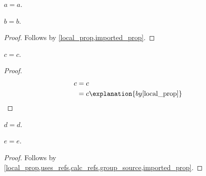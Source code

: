 

\begin{proposition}\label{local_prop}
    $a = a$.
\end{proposition}

\begin{proposition}\label{uses_refs}
    $b = b$.
\end{proposition}
\begin{proof}
    Follows by \cref{local_prop,imported_prop}.
\end{proof}

\begin{proposition}\label{calc_refs}
    $c = c$.
\end{proposition}
\begin{proof}
    \begin{align*}
        c
            &= c
                \\
            &= c
                \explanation{by \cref{local_prop}}
    \end{align*}
\end{proof}

\begin{proposition}\label{group_source}
    $d = d$.
\end{proposition}

\begin{proposition}\label{many_refs}
    $e = e$.
\end{proposition}
\begin{proof}
    Follows by \cref{local_prop,uses_refs,calc_refs,group_source,imported_prop}.
\end{proof}
